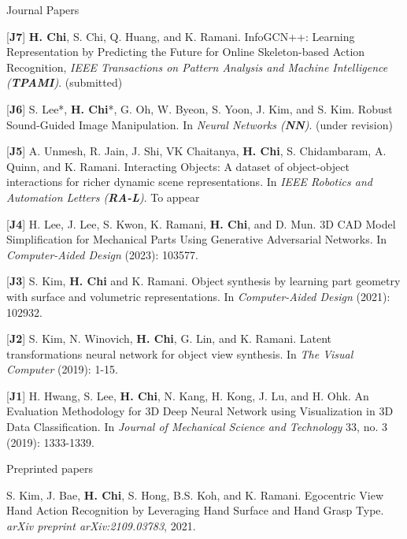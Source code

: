 \begin{cventries}
\vspace{-.5em}
\cvpub
{Journal Papers} %
{ %
\begin{cvitems}
    \item {[\textbf{J7}] \textbf{H. Chi}, S. Chi, Q. Huang, and K. Ramani. InfoGCN++: Learning Representation by Predicting the Future for Online Skeleton-based Action Recognition, \textit{IEEE Transactions on Pattern Analysis and Machine Intelligence (\textbf{TPAMI})}. (submitted) }
    \item {[\textbf{J6}] S. Lee*, \textbf{H. Chi}*, G. Oh, W. Byeon, S. Yoon, J. Kim, and S. Kim. Robust Sound-Guided Image Manipulation. In \textit{Neural Networks (\textbf{NN})}. (under revision)}
    \item {[\textbf{J5}] A. Unmesh,  R. Jain, J. Shi, VK Chaitanya, \textbf{H. Chi}, S. Chidambaram, A. Quinn, and K. Ramani. Interacting Objects: A dataset of object-object interactions for richer dynamic scene representations. In \textit{IEEE Robotics and Automation Letters (\textbf{RA-L})}. To appear}
    \item {[\textbf{J4}] H. Lee, J. Lee, S. Kwon, K. Ramani, \textbf{H. Chi}, and D. Mun. 3D CAD Model Simplification for Mechanical Parts Using Generative Adversarial Networks. In \textit{Computer-Aided Design} (2023): 103577.}
    \item {[\textbf{J3}] S. Kim, \textbf{H. Chi} and K. Ramani. Object synthesis by learning part geometry with surface and volumetric representations. In \textit{Computer-Aided Design} (2021): 102932.}
    \item {[\textbf{J2}] S. Kim, N. Winovich, \textbf{H. Chi}, G. Lin, and K. Ramani. Latent transformations neural network for object view synthesis. In \textit{The Visual Computer} (2019): 1-15.}
    \item {[\textbf{J1}] H. Hwang, S. Lee, \textbf{H. Chi}, N. Kang, H. Kong, J. Lu, and H. Ohk. An Evaluation Methodology for 3D Deep Neural Network using Visualization in 3D Data Classification. In \textit{Journal of Mechanical Science and Technology} 33, no. 3 (2019): 1333-1339.}
\end{cvitems}
}

\vspace{-.5em}
\cvpub
{Preprinted papers} %
{
\begin{cvitems}
    \item {S. Kim, J. Bae, \textbf{H. Chi}, S. Hong, B.S. Koh, and K. Ramani. Egocentric View Hand Action Recognition by Leveraging Hand Surface and Hand Grasp Type. \textit{arXiv preprint arXiv:2109.03783}, 2021. }
\end{cvitems}
}


\end{cventries}
